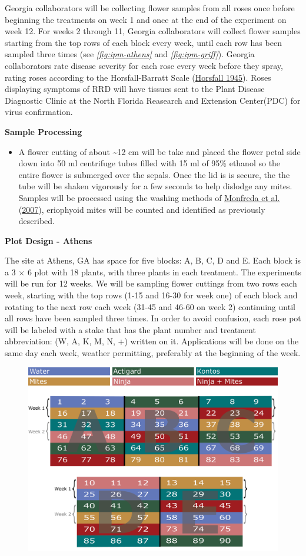 \documentclass[12pt,final,CPage]{ufthesis}
\begin{document}
{  Georgia collaborators will be collecting flower samples from all roses once before beginning the treatments on week 1 and once at the end of the experiment on week 12. For weeks 2 through 11, Georgia collaborators will collect flower samples starting from the top rows of each block every week, until each row has been sampled three times (see \emph{\ref{fig:ipm-athens}} and \emph{\ref{fig:ipm-griff}}). Georgia collaborators rate disease severity for each rose every week before they spray, rating roses according to the Horsfall-Barratt Scale (\protect\hyperlink{ref-Horsfall1945}{Horsfall 1945}). Roses displaying symptoms of RRD will have tissues sent to the Plant Disease Diagnostic Clinic at the North Florida Reasearch and Extension Center(PDC) for virus confirmation.

  \textbf{Sample Processing}
  \begin{itemize}
  \tightlist
  \item
    A flower cutting of about \textasciitilde12 cm will be take and placed the flower petal side down into 50 ml centrifuge tubes filled with 15 ml of 95\% ethanol so the entire flower is submerged over the sepals. Once the lid is is secure, the the tube will be shaken vigorously for a few seconds to help dislodge any mites. Samples will be processed using the washing methods of \protect\hyperlink{ref-Monfreda2007}{Monfreda et al.} (\protect\hyperlink{ref-Monfreda2007}{2007}), eriophyoid mites will be counted and identified as previously described.
  \end{itemize}
  \textbf{Plot Design - Athens}

  The site at Athens, GA has space for five blocks: A, B, C, D and E. Each block is a 3 \(\times\) 6 plot with 18 plants, with three plants in each treatment. The experiments will be run for 12 weeks. We will be sampling flower cuttings from two rows each week, starting with the top rows (1-15 and 16-30 for week one) of each block and rotating to the next row each week (31-45 and 46-60 on week 2) continuing until all rows have been sampled three times. In order to avoid confusion, each rose pot will be labeled with a stake that has the plant number and treatment abbreviation: (W, A, K, M, N, +) written on it. Applications will be done on the same day each week, weather permitting, preferably at the beginning of the week.
  \begin{figure}

  {\centering \includegraphics[width=0.8\linewidth]{figure/rrv_ipm_plot_map_2019_athens} 

}
\end{figure}}
\end{document}
